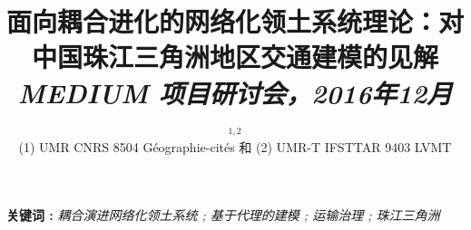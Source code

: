


\title{面向耦合进化的网络化领土系统理论：对中国珠江三角洲地区交通建模的见解
\\\bigskip
\bigskip
\bigskip
\textit{MEDIUM 项目研讨会，2016年12月}
}\bigskip
\bigskip
\author{$^{1,2}$\\
\small(1) UMR CNRS 8504 Géographie-cités 和 (2) UMR-T IFSTTAR 9403 LVMT
}
\date{}

\maketitle

\justify




\vspace{0.2cm}

\textbf{关键词 : }\textit{耦合演进网络化领土系统 ; 基于代理的建模 ; 运输治理 ; 珠江三角洲}

\vspace{0.5cm}

